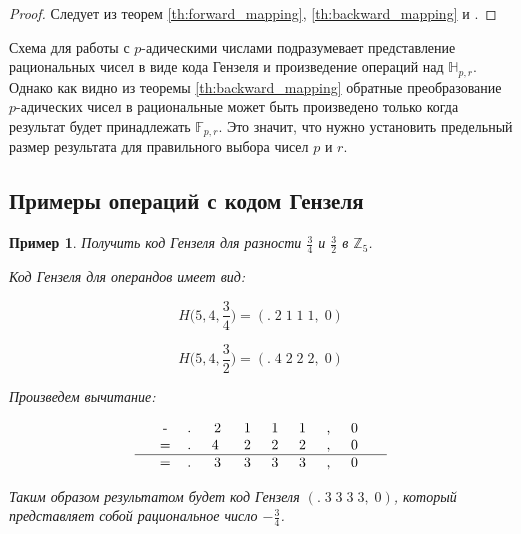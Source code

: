 \documentclass[master, och, diploma, times]{sty/SCWorks}
\theoremstyle{plain}
\newtheorem{exmp}{Пример}[section]
\theoremstyle{definition}
\begin{document}
\begin{proof} 
Следует из теорем \ref{th:forward_mapping}, \ref{th:backward_mapping} и \cite{bib:numbers:krishnamurthy}.
\end{proof}

Схема для работы с $p$-адическими числами подразумевает представление рациональных чисел в виде кода Гензеля и произведение операций над $\mathbb{H}_{p,r}$. Однако как видно из теоремы \ref{th:backward_mapping} обратные преобразование $p$-адических чисел в рациональные может быть произведено только когда результат будет принадлежать $\mathbb{F}_{p,r}$. Это значит, что нужно установить предельный размер результата для правильного выбора чисел $p$ и $r$.


\subsection{Примеры операций с кодом Гензеля}

\begin{exmp}
Получить код Гензеля для разности $\frac{3}{4}$ и $\frac{3}{2}$ в $\mathbb{Z}_5$.

\noindent Код Гензеля для операндов имеет вид:

$$H\bigg(5,4, \frac{3}{4}\bigg)=(.\; 2\; 1\; 1\; 1,\; 0)$$

$$H\bigg(5,4, \frac{3}{2}\bigg)=(.\; 4\; 2\; 2\; 2,\; 0)$$


\noindent Произведем вычитание:

$$
\begin{tabular}{ccccccccccc}
& - & .\; & 2\; & 1\; & 1\; & 1\; & ,\; & 0\; &  \\
& = & .\; & 4 \; & 2\; & 2\; & 2\; & ,\; & 0\; &  \\
\hline
& = & .\; & 3\; & 3\; & 3\; & 3\; & ,\; & 0\; &
\end{tabular}
$$


\noindent Таким образом результатом будет код Гензеля $(.\; 3\; 3\; 3\; 3,\; 0)$, который представляет собой рациональное число $-\frac{3}{4}$.
\end{exmp}
\end{document}
